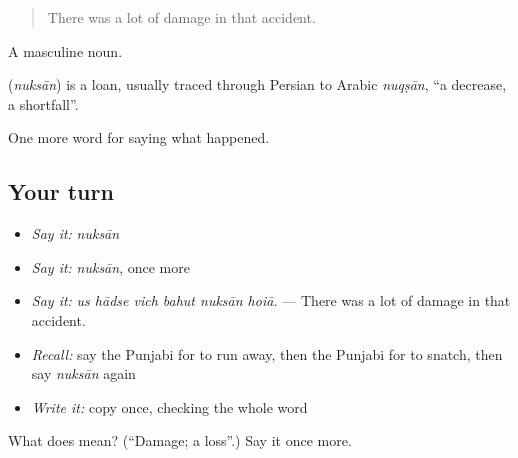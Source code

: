 \begin{quote}
There was a lot of damage in that accident.
\end{quote}

A masculine noun.

\begin{cousinweb}
\textbf{} (\emph{nuksān}) is a loan, usually traced through Persian to Arabic \emph{nuqṣān}, \textquotedblleft{}a decrease, a shortfall\textquotedblright{}.
\end{cousinweb}

\begin{grammarlens}[title={What you've built}]
One more word for saying what happened.
\end{grammarlens}

\subsection*{Your turn}
\begin{itemize}
\raggedright
  \item \emph{Say it:} \emph{nuksān}
  \item \emph{Say it:} \emph{nuksān}, once more
  \item \emph{Say it:} \emph{us hādse vich bahut nuksān hoiā.} — There was a lot of damage in that accident.
  \item \emph{Recall:} say the Punjabi for to run away, then the Punjabi for to snatch, then say \emph{nuksān} again
  \item \emph{Write it:} copy \textbf{} once, checking the whole word
\end{itemize}

\begin{tcolorbox}[breakable,colback=teal!4,colframe=teal!35!black,title={Before you move on}]
What does  mean? (\textquotedblleft{}Damage; a loss\textquotedblright{}.) Say it once more.
\end{tcolorbox}
